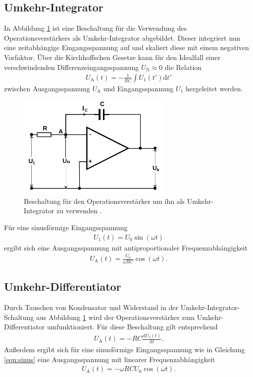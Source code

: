 \subsection{Umkehr-Integrator}

In Abbildung \ref{fig:integrator} ist eine Beschaltung für die Verwendung des Operationsverstärkers
als Umkehr-Integrator abgebildet. Dieser integriert nun eine zeitabhängige Eingangsspannung auf
und skaliert diese mit einem negativen Vorfaktor.
Über die Kirchhoffschen Gesetze kann für den Idealfall einer verschwindenden Differenzeingangsspannung
$U_\text{N} \approx 0$ die Relation
\begin{align}
  U_\text{A}(t) = - \frac1{R C} \int U_1(t') \mathrm{d}t'
\end{align}
zwischen Ausgangsspannung $U_\text{A}$ und Eingangsspannung $U_1$ hergeleitet werden.

\begin{figure}
  \centering
  \includegraphics[height=5cm]{ImmerDieseNorweger/integrator.png}
  \caption{Beschaltung für den Operationsverstärker um ihn als Umkehr-Integrator zu verwenden \cite{anleitung}.}
  \label{fig:integrator}
\end{figure}

Für eine sinusförmige Eingangsspannung
\begin{align}
  U_1(t) = U_0 \sin \left( \omega t \right)
  \label{eqn:sinus}
\end{align}
ergibt sich eine Ausgangsspannung mit antiproportionaler Frequenzabhängigkeit
\begin{align}
  U_\text{A}(t) = \frac{U_0}{\omega R C} \cos \left( \omega t \right).
\end{align}

\subsection{Umkehr-Differentiator}

Durch Tauschen von Kondensator und Widerstand in der Umkehr-Integrator-Schaltung aus Abbildung \ref{fig:integrator}
wird der Operationsverstärker zum Umkehr-Differentiator umfunktioniert.
Für diese Beschaltung gilt entsprechend
\begin{align}
  U_\text{A}(t) = - RC \frac{\mathrm{d} U_1(t)}{\mathrm{d}t}.
\end{align}
Außerdem ergibt sich für eine sinusförmige Eingangsspannung wie in Gleichung \eqref{eqn:sinus}
eine Ausgangsspannung mit linearer Frequenzabhängigkeit
\begin{align}
  U_\text{A}(t) = - \omega R C U_0 \cos \left( \omega t \right).
\end{align}

